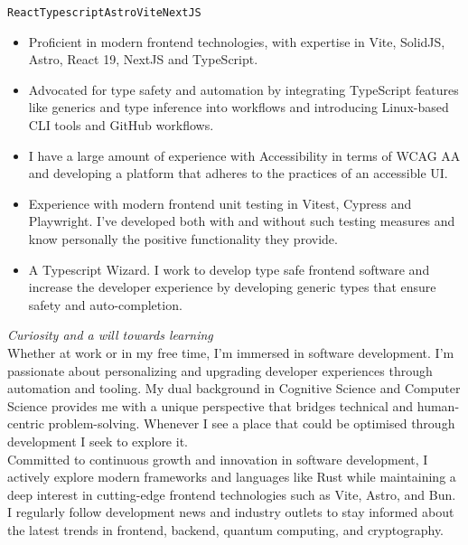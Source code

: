 \documentclass[9pt]{developercv} %
\begin{document}

\vspace{-5px}
\texttt{React}\slashsep\texttt{Typescript}\slashsep\texttt{Astro}\slashsep\texttt{Vite}\slashsep\texttt{NextJS}

\begin{itemize}
	\item Proficient in modern frontend technologies, with expertise in Vite, SolidJS, Astro, React 19, NextJS and TypeScript.
	\item Advocated for type safety and automation by integrating TypeScript features like generics and type inference into workflows and introducing Linux-based CLI tools and GitHub workflows.
	\item I have a large amount of experience with Accessibility in terms of WCAG AA and developing a platform that adheres to the practices of an accessible UI.
	\item Experience with modern frontend unit testing in Vitest, Cypress and Playwright. I’ve developed both with and without such testing measures and know personally the positive functionality they provide.
	\item A Typescript Wizard. I work to develop type safe frontend software and increase the developer experience by developing generic types that ensure safety and auto-completion.
\end{itemize}



\vspace{-5px}
\textcolor{BurntOrange}{\textit{Curiosity and a will towards learning}}\\

Whether at work or in my free time, I’m immersed in software development. I’m passionate about personalizing and upgrading developer experiences through automation and tooling. My dual background in Cognitive Science and Computer Science provides me with a unique perspective that bridges technical and human-centric problem-solving. Whenever I see a place that could be optimised through development I seek to explore it.\\

Committed to continuous growth and innovation in software development, I actively explore modern frameworks and languages like Rust while maintaining a deep interest in cutting-edge frontend technologies such as Vite, Astro, and Bun. I regularly follow development news and industry outlets to stay informed about the latest trends in frontend, backend, quantum computing, and cryptography.
\end{document}
